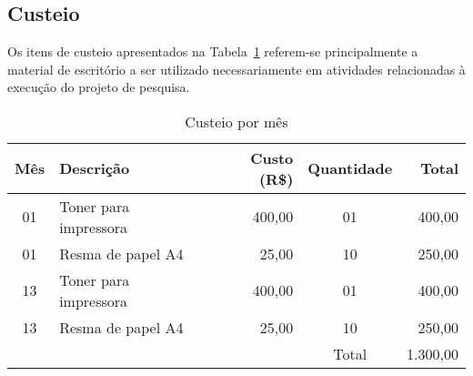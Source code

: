 \subsection{Custeio}
Os itens de custeio apresentados na Tabela~\ref{tab:custeio} referem-se principalmente a material de escritório a ser utilizado necessariamente em atividades relacionadas à execução do projeto de pesquisa.
\begin{table}[!h]
\centering
	\caption{Custeio por mês}
\begin{tabular}{clrcr}
\toprule
	Mês   & Descrição              & Custo (R\$) & Quantidade & Total \\
	\midrule
	01    & Toner para impressora  & 400,00      & 01         & 400,00 \\
	01    & Resma de papel A4      &  25,00      & 10         & 250,00 \\
	13    & Toner para impressora  & 400,00      & 01         & 400,00 \\
	13    & Resma de papel A4      &  25,00      & 10         & 250,00 \\
\midrule
	      &                        &             & Total      &1.300,00 \\
\bottomrule
\end{tabular}
	\label{tab:custeio}
\end{table}
 
